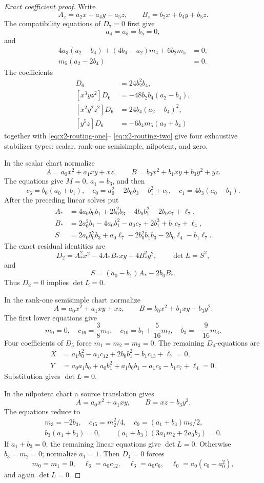\begin{proof}[Exact coefficient proof]
Write
\[
 A_z=a_2x+a_4y+a_5z,
 \qquad
 B_z=b_2x+b_4y+b_5z.
\]
The compatibility equations of \(D_7=0\) first give
\[
 a_4=a_5=b_5=0,
\]
and
\begin{align}
4a_3(a_2-b_4)+(4b_4-a_2)m_4+6b_2m_5&=0,
\label{eq:x2-routing-one}\\
m_5(a_2-2b_4)&=0.
\label{eq:x2-routing-two}
\end{align}
The coefficients
\begin{align*}
[x^4z^2]D_6&=24b_2^2b_4,\\
[x^3yz^2]D_6&=-48b_2b_4(a_2-b_4),\\
[x^2y^2z^2]D_6&=24b_4(a_2-b_4)^2,\\
[y^5z]D_6&=-6b_4m_5(a_2+b_4)
\end{align*}
together with \eqref{eq:x2-routing-one}--
\eqref{eq:x2-routing-two} give four exhaustive stabilizer types:
scalar, rank-one semisimple, nilpotent, and zero.

In the scalar chart normalize
\[
 A=a_0x^2+a_1xy+xz,
 \qquad
 B=b_0x^2+b_1xy+b_3y^2+yz.
\]
The equations give \(M=0\), \(a_1=b_3\), and then
\[
 c_6=b_0(a_0+b_1),\quad
 c_0=a_0^2-2b_0b_3-b_1^2+c_7,
 \quad c_1=4b_3(a_0-b_1).
\]
After the preceding linear solves put
\begin{align*}
 A_*&=4a_0b_0b_1+2b_0^2b_3-4b_0b_1^2-2b_0c_7+\ell_7,\\
 B_*&=2a_0^2b_1-4a_0b_1^2-a_0c_7+2b_1^3+b_1c_7+\ell_4,\\
 S&=2a_0b_0^2b_3+a_0\ell_7-2b_0^2b_1b_3-2b_0\ell_4-b_1\ell_7.
\end{align*}
The exact residual identities are
\[
 D_2=A_*^2x^2-4A_*B_*xy+4B_*^2y^2,
 \qquad
 \det L=S^2,
\]
and
\[
 S=(a_0-b_1)A_*-2b_0B_*.
\]
Thus \(D_2=0\) implies \(\det L=0\).

In the rank-one semisimple chart normalize
\[
 A=a_0x^2+a_1xy+xz,
 \qquad
 B=b_0x^2+b_1xy+b_3y^2.
\]
The first lower equations give
\[
 m_0=0,
 \quad c_{16}=\frac38m_1,
 \quad c_{10}=b_1+\frac5{16}m_2,
 \quad b_3=-\frac9{16}m_3.
\]
Four coefficients of \(D_5\) force \(m_1=m_2=m_3=0\).  The remaining
\(D_4\)-equations are
\[
\begin{aligned}
X&=a_1b_0^2-a_1c_{12}+2b_0b_1^2-b_1c_{13}+\ell_7=0,\\
Y&=a_0a_1b_0+a_0b_1^2+a_1b_0b_1-a_1c_6-b_1c_7+\ell_4=0.
\end{aligned}
\]
Substitution gives \(\det L=0\).

In the nilpotent chart a source translation gives
\[
 A=a_0x^2+a_1xy,
 \qquad
 B=xz+b_3y^2.
\]
The equations reduce to
\[
\begin{gathered}
 m_3=-2b_3,
 \quad c_{15}=m_2^2/4,
 \quad c_9=(a_1+b_3)m_2/2,\\
 b_3(a_1+b_3)=0,
 \qquad
 (a_1+b_3)(3a_1m_2+2a_0b_3)=0.
\end{gathered}
\]
If \(a_1+b_3=0\), the remaining linear equations give \(\det L=0\).
Otherwise \(b_3=m_2=0\); normalize \(a_1=1\).  Then \(D_4=0\) forces
\[
 m_0=m_1=0,
 \quad \ell_6=a_0c_{12},
 \quad \ell_3=a_0c_6,
 \quad \ell_0=a_0(c_0-a_0^2),
\]
and again \(\det L=0\).


\end{proof}
